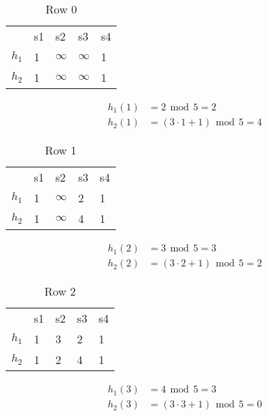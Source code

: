 \documentclass[11pt,twoside,a4paper]{article}
\begin{document}
	\begin{table}[h!]
	\centering
	\label{my-label}
	\begin{tabular}{lllll}
	 & s1 & s2 & s3 & s4 \\
	 $h_1$ & 1 & $\infty$ & $\infty$ & 1 \\
	 $h_2$ & 1 & $\infty$ & $\infty$ & 1
	\end{tabular}
	\caption{Row 0}
	\end{table}
	
	\begin{align}
		h_1(1) &= 2 \hspace{5pt} \mbox{mod} \hspace{5pt} 5 = 2 \\
		h_2(1) &= (3 \cdot 1 + 1) \hspace{5pt} \mbox{mod} \hspace{5pt} 5 = 4 
	\end{align}
	
	\begin{table}[h!]
	\centering
	\label{my-label}
	\begin{tabular}{lllll}
	 & s1 & s2 & s3 & s4 \\
	 $h_1$ & 1 & $\infty$ & 2 & 1 \\
	 $h_2$ & 1 & $\infty$ & 4 & 1
	\end{tabular}
	\caption{Row 1}
	\end{table}
	
	\begin{align}
		h_1(2) &= 3 \hspace{5pt} \mbox{mod} \hspace{5pt} 5 = 3 \\
		h_2(2) &= (3 \cdot 2 + 1) \hspace{5pt} \mbox{mod} \hspace{5pt} 5 = 2 
	\end{align}
	
	\begin{table}[h!]
	\centering
	\label{my-label}
	\begin{tabular}{lllll}
	 & s1 & s2 & s3 & s4 \\
	 $h_1$ & 1 & 3 & 2 & 1 \\
	 $h_2$ & 1 & 2 & 4 & 1
	\end{tabular}
	\caption{Row 2}
	\end{table}
	
	\begin{align}
		h_1(3) &= 4 \hspace{5pt} \mbox{mod} \hspace{5pt} 5 = 3 \\
		h_2(3) &= (3 \cdot 3 + 1) \hspace{5pt} \mbox{mod} \hspace{5pt} 5 = 0
	\end{align}
	
\end{document}
